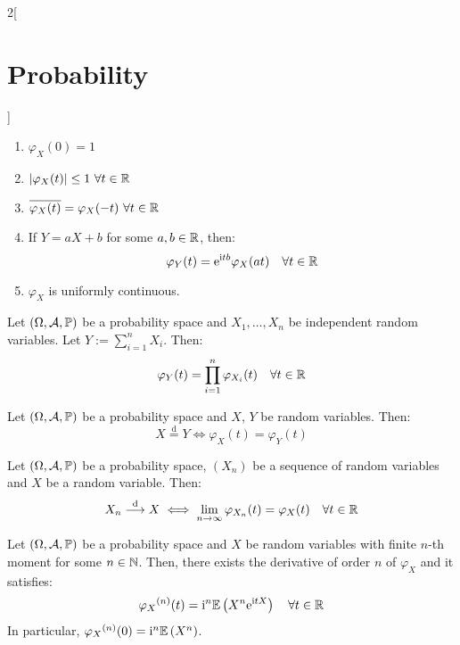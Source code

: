 \documentclass[../../../main_math.tex]{subfiles}
\begin{document}
\begin{multicols}{2}[\section{Probability}]
\begin{proposition}
    \begin{enumerate}
      \item $\varphi_X(0)=1$
      \item $\abs{\varphi_X(t)}\leq 1\ \forall t\in\mathbb{R}$
      \item $\overline{\varphi_X(t)}=\varphi_X(-t)\ \forall t\in\RR$
      \item If $Y=aX+b$ for some $a,b\in \mathbb{R}$, then: $$\varphi_Y(t)=\mathrm{e}^{\mathrm{i} t b}\varphi_X(at)\quad\forall t\in\mathbb{R}$$
      \item $\varphi_X$ is uniformly continuous.
    \end{enumerate}
  \end{proposition}
  \begin{theorem}
    Let $(\Omega,\mathcal{A},\mathbb{P})$ be a probability space and $X_1,\ldots,X_n$ be independent random variables. Let $Y:=\sum_{i=1}^n X_i$. Then: $$\varphi_Y(t)=\prod_{i=1}^n\varphi_{X_i}(t)\quad\forall t\in\mathbb{R}$$
  \end{theorem}
  \begin{theorem}
    Let $(\Omega,\mathcal{A},\mathbb{P})$ be a probability space and $X$, $Y$ be random variables. Then: $$X\overset{\text{d}}{=}Y\iff \varphi_X(t)=\varphi_Y(t)$$
  \end{theorem}
  \begin{theorem}
    Let $(\Omega,\mathcal{A},\mathbb{P})$ be a probability space, $(X_n)$ be a sequence of random variables and $X$ be a random variable. Then:
    $$X_n\overset{\text{d}}{\longrightarrow} X\iff\lim_{n\to\infty}\varphi_{X_n}(t)=\varphi_X(t)\quad\forall t\in\mathbb{R}$$
  \end{theorem}
  \begin{proposition}
    Let $(\Omega,\mathcal{A},\mathbb{P})$ be a probability space and $X$ be random variables with finite $n$-th moment for some $n\in\mathbb{N}$. Then, there exists the derivative of order $n$ of $\varphi_X$ and it satisfies: $${\varphi_X}^{(n)}(t)=\mathrm{i}^n\mathbb{E}\left(X^n\mathrm{e}^{\mathrm{i} t X}\right)\quad\forall t\in\mathbb{R}$$ In particular, ${\varphi_X}^{(n)}(0)=\mathrm{i}^n\mathbb{E}\left(X^n\right)$.
  \end{proposition}

\end{multicols}
\end{document}
